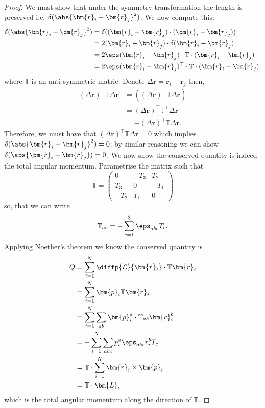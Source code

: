 \documentclass[12pt, a4paper]{article}
\newcommand{\LL}{\mathcal L}
\begin{document}
\begin{proof}
    We must show that under the symmetry transformation the length is preserved i.e. \(\delta(\abs{\bm{r}_i-\bm{r}_j}^2)\). We now compute this:
    \[\begin{aligned}
        \delta(\abs{\bm{r}_i-\bm{r}_j}^2) &= \delta((\bm{r}_i-\bm{r}_j)\cdot (\bm{r}_i-\bm{r}_j)) \\
        &= 2(\bm{r}_i-\bm{r}_j) \cdot \delta(\bm{r}_i-\bm{r}_j) \\
        &= 2\eps (\bm{r}_i-\bm{r}_j) \cdot \mathbb{T} \cdot (\bm{r}_i-\bm{r}_j) \\
        &= 2\eps (\bm{r}_i-\bm{r}_j)^{\top} \cdot \mathbb{T} \cdot (\bm{r}_i-\bm{r}_j),
    \end{aligned}\]
    where \(\mathbb{T}\) is an anti-symmetric matric. Denote \(\Delta \bm{r}=\bm{r}_i-\bm{r}_j\) then, 
    \[\begin{aligned}
        (\Delta \bm{r})^{\top} \mathbb{T} \Delta \bm{r} &= \left( (\Delta \bm{r})^{\top} \mathbb{T} \Delta \bm{r} \right) \\
        &= (\Delta \bm{r})^{\top} \mathbb{T}^{\top} \Delta \bm{r} \\
        &= -(\Delta \bm{r})^{\top} \mathbb{T}\Delta \bm{r}.
    \end{aligned}\]
    Therefore, we must have that \((\Delta \bm{r})^{\top}\mathbb{T}\Delta \bm{r}=0\) which implies \(\delta(\abs{\bm{r}_i-\bm{r}_j}^2) =0\); by similar reasoning we can show \(\delta(\abs{\bm{\dot{r}}_i-\bm{\dot{r}}_j})=0\). We now show the conserved quantity is indeed the total angular momentum. Parametrise the matrix such that 
    \[\mathbb{T} = \begin{pmatrix}
        0 & -T_3 & T_2 \\
        T_3 & 0 & -T_1 \\
        -T_2 & T_1 & 0
    \end{pmatrix}\]
    so, that we can write 
    \[\mathbb{T}_{ab} = -\sum_{c=1}^{3} \eps_{abc} T_c.\]
    Applying Noether's theorem we know the conserved quantity is 
    \[\begin{aligned}
        Q &= \sum_{i=1}^N \diffp{\LL}{{\bm{\dot{r}}_i}} \cdot \mathbb{T} \bm{r}_i \\
        &= \sum_{i=1}^{N} \bm{p}_i \mathbb{T}\bm{r}_i \\
        &= \sum_{i=1}^{N} \sum_{ab} \bm{p}_i^a \cdot \mathbb{T}_{ab} \bm{r}_i^b \\
        &= - \sum_{i=1}^{N} \sum_{abc} p_i^a \eps_{abc} r^{b}_i T_c \\
        &= \mathbb{T} \cdot \sum_{i=1}^{N} \bm{r}_i \times \bm{p}_i \\
        &= \mathbb{T} \cdot \bm{L},
    \end{aligned}\]
    which is the total angular momentum along the direction of \(\mathbb{T}\).
\end{proof}
\end{document}

